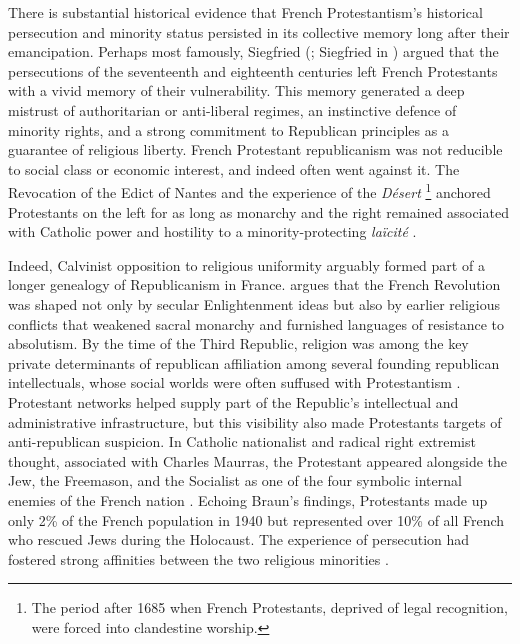 \documentclass[12pt]{article}
\begin{document}

There is substantial historical evidence that French Protestantism's historical persecution and minority status persisted in its collective memory long after their emancipation. Perhaps most famously, Siegfried (\cite*{siegfriedGeographieElectoraleLArdeche1949}; Siegfried in \cite{latreilleForcesReligieusesVie1951}) argued that the persecutions of the seventeenth and eighteenth centuries left French Protestants with a vivid memory of their vulnerability. This memory generated a deep mistrust of authoritarian or anti-liberal regimes, an instinctive defence of minority rights, and a strong commitment to Republican principles as a guarantee of religious liberty. French Protestant republicanism was not reducible to social class or economic interest, and indeed often went against it. The Revocation of the Edict of Nantes and the experience of the \textit{Désert} \footnote{The period after 1685 when French Protestants, deprived of legal recognition, were forced into clandestine worship.} anchored Protestants on the left for as long as monarchy and the right remained associated with Catholic power and hostility to a minority-protecting \textit{laïcité} \parencite{cabanelGirondeGardoiseExistetil2004, encreveProtestantsFrance18001985, schramProtestantismPoliticsFrance1954}.

Indeed, Calvinist opposition to religious uniformity arguably formed part of a longer genealogy of Republicanism in France. \textcite{vankleyReligiousOriginsFrench1996} argues that the French Revolution was shaped not only by secular Enlightenment ideas but also by earlier religious conflicts that weakened sacral monarchy and furnished languages of resistance to absolutism. By the time of the Third Republic, religion was among the key private determinants of republican affiliation among several founding republican intellectuals, whose social worlds were often suffused with Protestantism \parencite{hazareesinghIntellectualFoundersRepublic2004, cabanelGirondeGardoiseExistetil2004}. Protestant networks helped supply part of the Republic's intellectual and administrative infrastructure, but this visibility also made Protestants targets of anti-republican suspicion. In Catholic nationalist and radical right extremist thought, associated with Charles Maurras, the Protestant appeared alongside the Jew, the Freemason, and the Socialist as one of the four symbolic internal enemies of the French nation \parencite[87, 134]{hazareesinghPoliticalTraditionsModern1996, schramProtestantismPoliticsFrance1954}. Echoing Braun's \parencite*{braunProtectorsPluralismReligious2019, braunReligiousMinoritiesResistance2016} findings, Protestants made up only 2\% of the French population in 1940 but represented over 10\% of all French who rescued Jews during the Holocaust. The experience of persecution had fostered strong affinities between the two religious minorities \parencite{cabanelProtestantMinoritiesJudeoProtestant2014}. 
\end{document}

